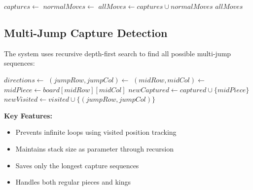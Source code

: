 \documentclass[12pt,a4paper]{article}
\begin{document}
\begin{algorithm}[H]
\caption{Valid Move Generation}
\begin{algorithmic}[1]
    \State $captures \gets$ 
    \State $normalMoves \gets$ 
    \State $allMoves \gets captures \cup normalMoves$ 
    \State \Return $allMoves$ 
\EndFunction
\end{algorithmic}
\end{algorithm}

\subsection{Multi-Jump Capture Detection}

The system uses recursive depth-first search to find all possible multi-jump sequences:

\begin{algorithm}[H]
\caption{Recursive Multi-Jump Detection}
\begin{algorithmic}[1]
    \State $directions \gets$ 
        \State $(jumpRow, jumpCol) \gets$ 
        \State $(midRow, midCol) \gets$ 
            \State $midPiece \gets board[midRow][midCol]$
                \State $newCaptured \gets captured \cup \{midPiece\}$
                \State $newVisited \gets visited \cup \{(jumpRow, jumpCol)\}$
                \State {}
            \EndIf
        \EndIf
    \EndFor
        \State {}
    \EndIf
\EndFunction
\end{algorithmic}
\end{algorithm}

\textbf{Key Features:}
\begin{itemize}
    \item Prevents infinite loops using visited position tracking
    \item Maintains stack size as parameter through recursion
    \item Saves only the longest capture sequences
    \item Handles both regular pieces and kings
\end{itemize}
\end{document}
